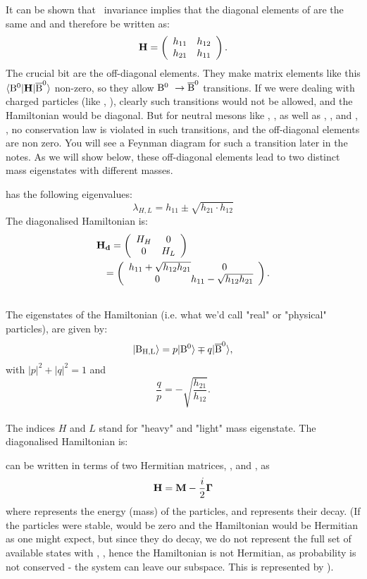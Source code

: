  It can be shown that \cpt\ invariance implies that the diagonal elements of  are the same and  and therefore be written as:
\begin{equation}
\mathbf{H}= \left( \begin{array}{cc} h_{11} & h_{12} \\ h_{21} & h_{11} \end{array} \right).
\end{equation}
The crucial bit are the off-diagonal elements. They make matrix elements like this $ \langle {\rm B^0} |
\mathbf{H} | {\rm \overline{B}^0} \rangle$ non-zero, so they allow ${\rm B^0}\ \to {\rm \overline{B}^0}$ transitions. If we were dealing with charged particles (like \Bp, \Bm), clearly such transitions would not be allowed, and the Hamiltonian would be diagonal. But for neutral mesons like \Bo, \Bob, as well as \Ko, \Kob, and \Do, \Dob, no conservation law is violated in such transitions, and the off-diagonal elements are non zero. You will see a Feynman diagram for such a transition later in the notes. As we will show below, these off-diagonal elements lead to two distinct mass eigenstates with different masses.

  has the following eigenvalues:
\begin{equation}
\lambda_{H,L}=h_{11}\pm \sqrt{h_{21}\cdot h_{12}}
\end{equation}
The diagonalised Hamiltonian is:
\begin{eqnarray}
%
\lefteqn{\op{H_d} = \mII{H_H}{0}{0}{H_L} }\nonumber\\
         & &
= \mII{h_{11} + \sqrt{h_{12} h_{21}}\!\!\!}{0}
    {0}{\!\!\!h_{11} - \sqrt{h_{12} h_{21}}}
.
\nonumber\\
\mbox{}
\end{eqnarray}
 The eigenstates of the Hamiltonian (i.e. what we'd call "real" or "physical" particles), are given by:
\begin{equation}
\label{eq:th.a.def_Bl_Bh}
 | {\rm B_{H,L}} \rangle = p  | {\rm B^0} \rangle \mp q  | {\rm \overline{B}^0} \rangle,
\end{equation}
with $|p|^2 + |q|^2 = 1$ and
\begin{equation}
\frac{q}{p}= -\sqrt{\frac{h_{21}}{h_{12}}}.
\end{equation}\\
The indices $H$ and $L$ stand for "heavy" and "light" mass eigenstate.
 The diagonalised Hamiltonian  is:
 
 can be written in terms of two Hermitian matrices, , and \op{\Gamma}, as
\begin{equation}
\mathbf{H}= \mathbf{M} - \frac{i}{2} \mathbf{\Gamma}
\end{equation}
where  represents the energy (mass) of the particles, and \op{\Gamma} represents their decay.
(If the particles were stable, \op{\Gamma} would be zero and the Hamiltonian would be Hermitian as one might expect, but since they do decay, we do not represent the full set of available states with \Bo, \Bob, hence the Hamiltonian is not Hermitian, as probability is not conserved - the system can leave our subspace. This is represented by \op{\Gamma}).

